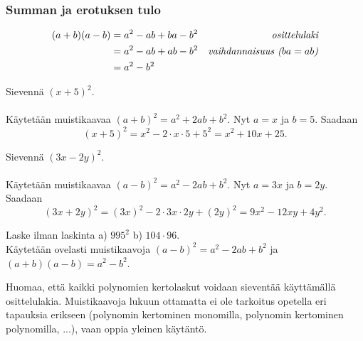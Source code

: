 \subsubsection*{Summan ja erotuksen tulo}

\begin{align*}
(a+b)(a-b) &= a^2-ab+ba-b^2 &\emph{osittelulaki} \\
&= a^2-ab+ab-b^2 &\emph{vaihdannaisuus ($ba=ab$)} \\
&= a^2-b^2
\end{align*}

\begin{esimerkki}
Sievennä $(x+5)^2$. \\
\quad\\
Käytetään muistikaavaa $(a+b)^2 = a^2+2ab+b^2$. Nyt $a = x$ ja $b = 5$.
Saadaan
        \[ (x+5)^2 = x^2-2\cdot x\cdot 5+5^2 = x^2+10x+25. \]
\end{esimerkki}

\begin{esimerkki}
Sievennä $(3x-2y)^2$. \\
\quad\\
Käytetään muistikaavaa $(a-b)^2 = a^2-2ab+b^2$. Nyt $a = 3x$ ja $b = 2y$.
Saadaan
        \[ (3x+2y)^2 = (3x)^2-2\cdot 3x\cdot 2y+(2y)^2 = 9x^2-12xy+4y^2. \]
\end{esimerkki}

\begin{esimerkki}
Laske ilman laskinta a) $995^2$ b) $104 \cdot 96$. \\
Käytetään ovelasti muistikaavoja $(a-b)^2 = a^2-2ab+b^2$ ja \mbox{$(a+b)(a-b) = a^2-b^2$}.
\begin{alakohdat}
\end{alakohdat}
\end{esimerkki}

Huomaa, että kaikki polynomien kertolaskut voidaan sieventää käyttämällä osittelulakia. Muistikaavoja lukuun ottamatta ei ole tarkoitus opetella eri tapauksia erikseen (polynomin kertominen monomilla, polynomin kertominen polynomilla, ...), vaan oppia yleinen käytäntö.

